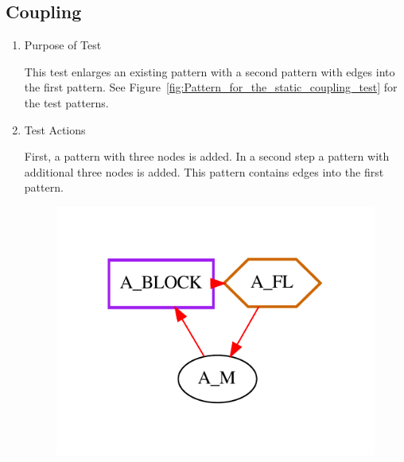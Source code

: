 \documentclass[12pt,a4paper]{report}
\begin{document}
\subsection{Coupling}
\begin{enumerate}
	\item Purpose of Test

	This test enlarges an existing pattern with a second pattern with edges into the first 
	pattern. See Figure~\ref{fig:Pattern_for_the_static_coupling_test} for the test patterns.
	\item Test Actions

	First, a pattern with three nodes is added. In a second step a pattern with additional three nodes is added. 
	This pattern contains edges into the first pattern.
    \begin{figure}
        \centering 
        \includegraphics{TestPattern/static_coupling1.pdf}

\end{figure}
\end{enumerate}
\end{document}
